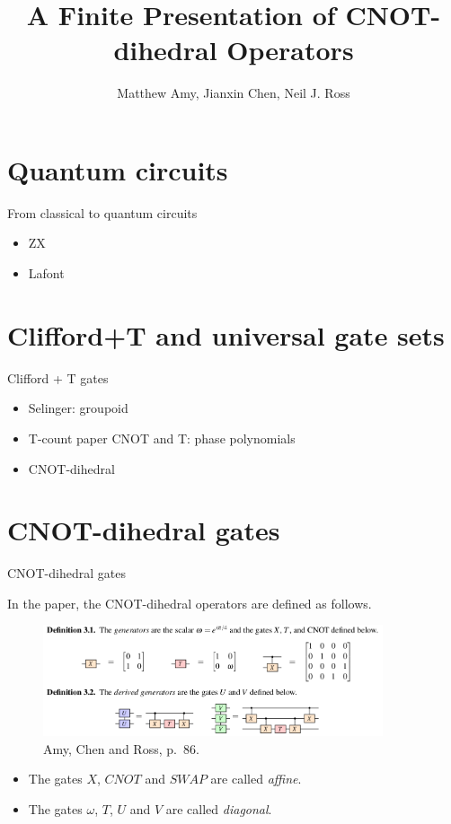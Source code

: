 \documentclass{beamer}
\theoremstyle{definition}
\newcommand{\changefont}[3]{\fontfamily{#1} \fontseries{#2} \fontshape{#3} \selectfont}
\begin{document}

\changefont{cmss}{m}{n}
\title{A Finite Presentation of CNOT-dihedral Operators}
\author{Matthew Amy, Jianxin Chen, Neil J. Ross}
\date{}
\frame{\titlepage}



\section{Quantum circuits}
\begin{frame}{From classical to quantum circuits}
	\begin{itemize}
		\item ZX
		\item Lafont
	\end{itemize}
\end{frame}
\section{Clifford+T and universal gate sets}
\begin{frame}{Clifford + T gates}
	\begin{itemize}
		\item Selinger: groupoid
		\item T-count paper CNOT and T: phase polynomials
		\item CNOT-dihedral
	\end{itemize}
\end{frame}

\section{CNOT-dihedral gates}

\begin{frame}{CNOT-dihedral gates}

In the paper, the CNOT-dihedral operators are defined as follows.
\begin{figure}
\includegraphics[width=10cm]{gates}
\centering
\caption{Amy, Chen and Ross, p.~86.}
\end{figure}
\begin{itemize}
\item The gates $X$, $CNOT$ and $SWAP$ are called {\em affine}.
\item The gates $\omega$, $T$, $U$ and $V$ are called {\em diagonal}.
\end{itemize}
\end{frame}
\end{document}
